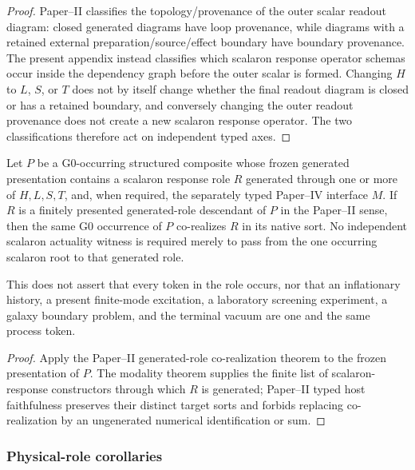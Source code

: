 \documentclass[12pt,a4paper]{article}
\begin{document}
\begin{proof}
Paper--II classifies the topology/provenance of the outer scalar readout diagram:
closed generated diagrams have loop provenance, while diagrams with a retained
external preparation/source/effect boundary have boundary provenance.  The
present appendix instead classifies which scalaron response operator schemas
occur inside the dependency graph before the outer scalar is formed.  Changing
$H$ to $L$, $S$, or $T$ does not by itself change whether the final readout
diagram is closed or has a retained boundary, and conversely changing the outer
readout provenance does not create a new scalaron response operator.  The two
classifications therefore act on independent typed axes. \qedhere
\end{proof}

\begin{corollary}
\label{p8:cor:scalaron-modalities-corealization}
Let $P$ be a G0-occurring structured composite whose frozen generated
presentation contains a scalaron response role $R$ generated through one or
more of $H,L,S,T$, and, when required, the separately typed Paper--IV interface
$M$.  If $R$ is a finitely presented generated-role descendant of $P$ in the
Paper--II sense, then the same G0 occurrence of $P$ co-realizes $R$ in its
native sort.  No independent scalaron actuality witness is required merely to
pass from the one occurring scalaron root to that generated role.

This does not assert that every token in the role occurs, nor that an
inflationary history, a present finite-mode excitation, a laboratory screening
experiment, a galaxy boundary problem, and the terminal vacuum are one and the
same process token.
\end{corollary}

\begin{proof}
Apply the Paper--II generated-role co-realization theorem to the frozen
presentation of $P$.  The modality theorem supplies the finite list of
scalaron-response constructors through which $R$ is generated; Paper--II typed
host faithfulness preserves their distinct target sorts and forbids replacing
co-realization by an ungenerated numerical identification or sum. \qedhere
\end{proof}

\subsubsection{Physical-role corollaries}
\end{document}
